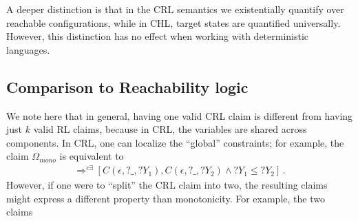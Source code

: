 A deeper distinction is that in the CRL semantics we existentially quantify over reachable configurations,
while in CHL, target states are quantified universally.
However, this distinction has no effect when working with deterministic languages.

\subsection{Comparison to Reachability logic}


We note here that in general, having one valid CRL claim is different from having just $k$ valid RL claims,
because in CRL, the variables are shared across components.
In CRL, one can localize the ``global'' constraints; for example, the claim $\Omega_{\textit{mono}}$
is equivalent to
\begin{align*}
[C(P, X_1, Y_1),C(P, X_2, Y_2) \land X_1 \leq X_2] 
\Rightarrow^{c\exists}
[C(\epsilon, ?\_, ?Y_1), C(\epsilon, ?\_, ?Y_2) \land ?Y_1 \leq ?Y_2] \, .
\end{align*}
However, if one were to ``split'' the CRL claim into two, the resulting claims might express
a different property than monotonicity.
For example, the two claims

